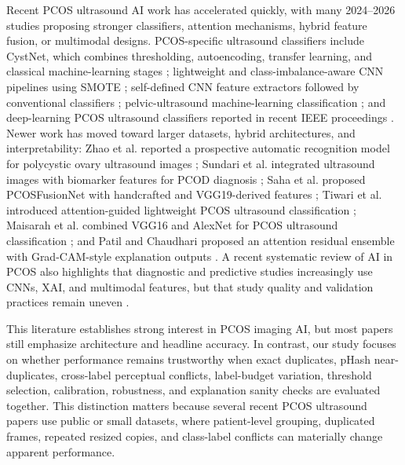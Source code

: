 \documentclass[pdflatex,sn-mathphys-num]{sn-jnl}
\theoremstyle{thmstyleone}
\theoremstyle{thmstyletwo}
\theoremstyle{thmstylethree}
\begin{document}
Recent PCOS ultrasound AI work has accelerated quickly, with many 2024--2026 studies proposing stronger classifiers, attention mechanisms, hybrid feature fusion, or multimodal designs. PCOS-specific ultrasound classifiers include CystNet, which combines thresholding, autoencoding, transfer learning, and classical machine-learning stages \cite{moral2024cystnet}; lightweight and class-imbalance-aware CNN pipelines using SMOTE \cite{ahmad2024smote}; self-defined CNN feature extractors followed by conventional classifiers \cite{paramasivam2024self_defined_cnn}; pelvic-ultrasound machine-learning classification \cite{kermanshahchi2024pelvic_ultrasound}; and deep-learning PCOS ultrasound classifiers reported in recent IEEE proceedings \cite{jency2024pcos_ultrasound}. Newer work has moved toward larger datasets, hybrid architectures, and interpretability: Zhao et al. reported a prospective automatic recognition model for polycystic ovary ultrasound images \cite{zhao2025automatic_recognition}; Sundari et al. integrated ultrasound images with biomarker features for PCOD diagnosis \cite{sundari2025integrative_pcod}; Saha et al. proposed PCOSFusionNet with handcrafted and VGG19-derived features \cite{saha2026pcosfusionnet}; Tiwari et al. introduced attention-guided lightweight PCOS ultrasound classification \cite{tiwari2026attention}; Maisarah et al. combined VGG16 and AlexNet for PCOS ultrasound classification \cite{maisarah2026hybrid}; and Patil and Chaudhari proposed an attention residual ensemble with Grad-CAM-style explanation outputs \cite{patil2026haren}. A recent systematic review of AI in PCOS also highlights that diagnostic and predictive studies increasingly use CNNs, XAI, and multimodal features, but that study quality and validation practices remain uneven \cite{ghaderzadeh2025pcos_ai_review}.

This literature establishes strong interest in PCOS imaging AI, but most papers still emphasize architecture and headline accuracy. In contrast, our study focuses on whether performance remains trustworthy when exact duplicates, pHash near-duplicates, cross-label perceptual conflicts, label-budget variation, threshold selection, calibration, robustness, and explanation sanity checks are evaluated together. This distinction matters because several recent PCOS ultrasound papers use public or small datasets, where patient-level grouping, duplicated frames, repeated resized copies, and class-label conflicts can materially change apparent performance.
\end{document}
